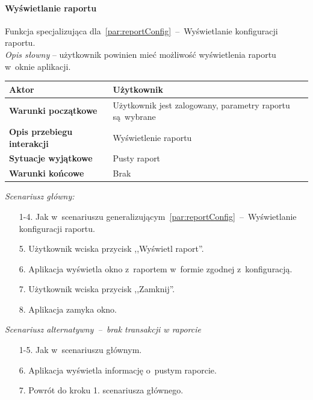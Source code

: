 \paragraph{Wyświetlanie raportu\newline}
\label{par:reportView}
\indent Funkcja specjalizująca dla~\ref{par:reportConfig}~--~Wyświetlanie konfiguracji raportu.\\

\textit{Opis słowny} -- użytkownik powinien mieć możliwość wyświetlenia raportu w~oknie aplikacji.

\begin{longtable}{|p{5cm}|p{7cm}|}
  \hline \textbf{Aktor} & Użytkownik \\
  \hline \textbf{Warunki początkowe} & Użytkownik jest zalogowany, parametry raportu są~wybrane \\
  \hline \textbf{Opis przebiegu interakcji} & Wyświetlenie raportu \\
  \hline \textbf{Sytuacje wyjątkowe} & Pusty raport \\
  \hline \textbf{Warunki końcowe} & Brak \\
  \hline
\end{longtable}

\noindent \textit{Scenariusz główny:}
\begin{enumerate}
  \item[1-4.] Jak w~scenariuszu generalizującym~\ref{par:reportConfig}~--~Wyświetlanie konfiguracji raportu.
  \item[5.] Użytkownik wciska przycisk ,,Wyświetl raport''.
  \item[6.] Aplikacja wyświetla okno z~raportem w~formie zgodnej z~konfiguracją.
  \item[7.] Użytkownik wciska przycisk ,,Zamknij''.
  \item[8.] Aplikacja zamyka okno.
\end{enumerate}

\noindent \textit{Scenariusz alternatywny~--~brak transakcji w raporcie}
\begin{enumerate}
  \item[1-5.] Jak w~scenariuszu głównym.
  \item[6.] Aplikacja wyświetla informację o~pustym raporcie.
  \item[7.] Powrót do kroku 1. scenariusza głównego.
\end{enumerate}


